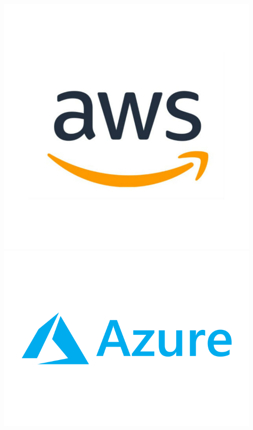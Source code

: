 \begin{table}[h]
\centering
\includegraphics[scale=0.2]{archivos/aws.png}
\includegraphics[scale=0.2]{archivos/azure.png}

\end{table}
